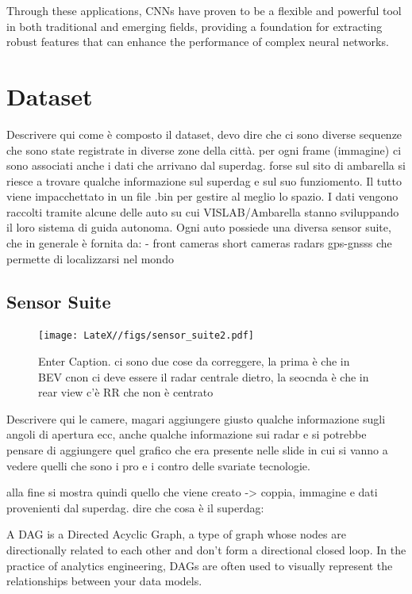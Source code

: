 Through these applications, CNNs have proven to be a flexible and powerful tool in both traditional and emerging fields, providing a foundation for extracting robust features that can enhance the performance of complex neural networks.


\section{Dataset}
Descrivere qui come è composto il dataset, devo dire che ci sono diverse sequenze che sono state registrate in diverse zone della città. per ogni frame (immagine) ci sono associati anche i dati che arrivano dal superdag. forse sul sito di ambarella si riesce a trovare qualche informazione sul superdag e sul suo funziomento. 
Il tutto viene impacchettato in un file .bin per gestire al meglio lo spazio. 
I dati vengono raccolti tramite alcune delle auto su cui VISLAB/Ambarella stanno sviluppando il loro sistema di guida autonoma. 
Ogni auto possiede una diversa sensor suite, che in generale è fornita da:
- front cameras
short cameras 
radars 
gps-gnsss che permette di localizzarsi nel mondo

\subsection{Sensor Suite}

\begin{figure}
    \centering
    \texttt{[image: LateX//figs/sensor\_suite2.pdf]}
    \caption{Enter Caption. ci sono due cose da correggere, la prima è che in BEV cnon ci deve essere il radar centrale dietro, la seocnda è che in rear view c'è RR che non è centrato}
    \label{fig:enter-label}
\end{figure}


Descrivere qui le camere, magari aggiungere giusto qualche informazione sugli angoli di apertura ecc, anche qualche informazione sui radar e si potrebbe pensare di aggiungere quel grafico che era presente nelle slide in cui si vanno a vedere quelli che sono i pro e i contro delle svariate tecnologie. 

alla fine si mostra quindi quello che viene creato -> coppia, immagine e dati provenienti dal superdag. 
dire che cosa è il superdag: 




A DAG is a Directed Acyclic Graph, a type of graph whose nodes are directionally related to each other and don’t form a directional closed loop. In the practice of analytics engineering, DAGs are often used to visually represent the relationships between your data models.

